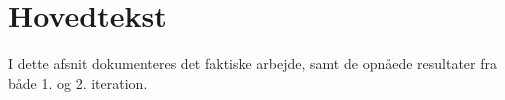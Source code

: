 \section{Hovedtekst}
I dette afsnit dokumenteres det faktiske arbejde, samt de opnåede resultater fra både 1. og 2. iteration.












